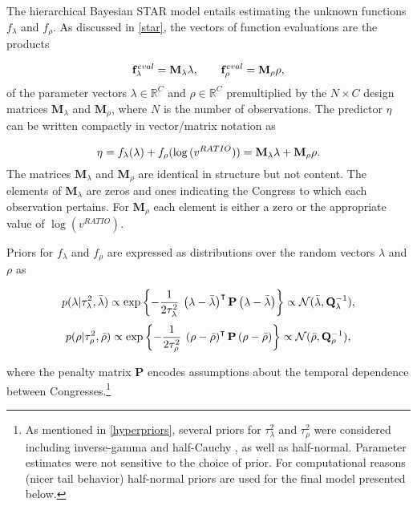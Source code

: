 The hierarchical Bayesian STAR model entails estimating the unknown functions $f_\lambda$ and $f_\rho$. As discussed in \ref{star}, the vectors of function evaluations are the products 

\begin{equation*}
\mathbf{f}^{eval}_\lambda = \mathbf{M}_\lambda \lambda, 
\qquad 
\mathbf{f}^{eval}_\rho =  \mathbf{M}_\rho \rho, 
\end{equation*}
%
\noindent of the parameter vectors $\lambda \in \mathbb{R}^C$ and $\rho \in \mathbb{R}^C$ premultiplied by the  $N \times C$ design matrices  $\mathbf{M}_\lambda$ and  $\mathbf{M}_\rho$, where $N$ is the number of observations. The predictor $\eta$ can be written compactly in vector/matrix notation as 

\begin{equation*}
 \eta = f_\lambda(\lambda) +  f_\rho(\log{(v^{RATIO})}) = \mathbf{M}_\lambda \lambda  + \mathbf{M}_\rho \rho.
\end{equation*}
\indent The matrices $\mathbf{M}_\lambda$ and $\mathbf{M}_\rho$ are identical in structure but not content. The elements of $\mathbf{M}_\lambda$ are zeros and ones indicating the Congress to which each observation pertains. For $\mathbf{M}_\rho$ each element is either a zero or the appropriate value of $\log{(v^{RATIO})}$. 


Priors for $f_{\lambda}$ and $f_{\rho}$ are expressed as distributions over the random vectors $\lambda$ and $\rho$ as 

\begin{equation*}
p(\lambda | \tau_\lambda^2, \bar{\lambda}) \propto \exp{\left\{-\frac{1}{2\tau_\lambda^2} \: \left(\lambda - \bar{\lambda}\right)^\intercal  \mathbf{P}   \left(\lambda - \bar{\lambda}\right) \right\}} \propto \mathcal{N} (\bar{\lambda}, \mathbf{Q}_\lambda^{-1}), 
\end{equation*}
\begin{equation*}
p(\rho | \tau_\rho^2, \bar{\rho}) \propto \exp{\left\{-\frac{1}{2\tau_\rho^2} \: \left(\rho - \bar{\rho}\right)^\intercal  \mathbf{P} \left(\rho-\bar{\rho}\right) \right\}} \propto \mathcal{N} (\bar{\rho}, \mathbf{Q}_\rho^{-1}), 
\end{equation*}

\noindent where the penalty matrix $\mathbf{P}$ encodes assumptions about the temporal dependence between Congresses.\footnote{As mentioned in \ref{hyperpriors}, several priors for $\tau^2_\lambda$ and $\tau^2_\rho$ were considered including inverse-gamma  and half-Cauchy , as well as half-normal. Parameter estimates were not sensitive to the choice of prior. For computational reasons (nicer tail behavior) half-normal priors are used for the final model presented below.}

